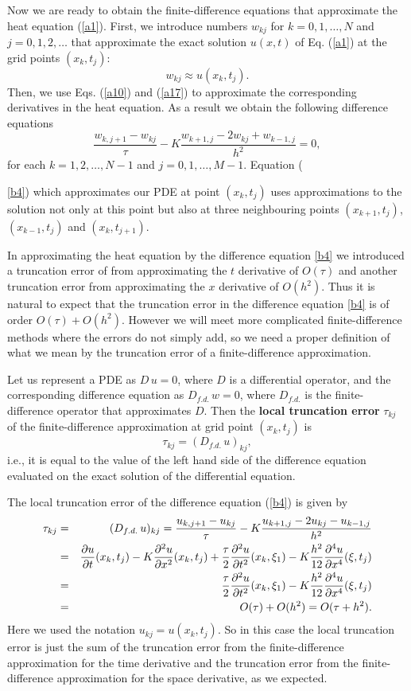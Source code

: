 Now we are ready to obtain the finite-difference equations that approximate
the heat equation (\ref{a1}). First, we introduce numbers $w_{kj}$ for $k=0,1,\dots,N$ and
$j=0,1,2,\dots$ that approximate the exact solution $u(x,t)$ of Eq. (\ref{a1}) at the grid points
$(x_{k}, t_{j})$:
\[
w_{kj}\approx u(x_{k},t_{j}).
\]
Then, we use Eqs. (\ref{a10}) and (\ref{a17}) to approximate
the corresponding derivatives in the heat equation. As a result we obtain the following
difference equations
\begin{equation}
\frac{w_{k,j+1}-w_{kj}}{\tau}-K
\frac{w_{k+1, j}-2w_{kj}+w_{k-1,j}}{h^{2}}=0, \label{b4}
\end{equation}
for each $k=1, 2, \dots, N-1$ and $j=0, 1, \dots, M-1$. Equation ({\ref{b4})
which approximates our PDE at point $(x_{k},t_{j})$ uses approximations to the solution
not only at this point but also
at three neighbouring points $(x_{k+1},t_{j})$, $(x_{k-1},t_{j})$ and $(x_{k},t_{j+1})$.

In approximating the heat equation by the difference equation \eqref{b4} we
introduced a truncation error of from approximating the $t$ derivative of $O(\tau)$
and another truncation error from approximating the $x$ derivative of $O(h^2)$.
Thus it is natural to expect that the truncation error in the difference
equation \eqref{b4} is of order $O(\tau)+O(h^2)$. However we will meet more 
complicated finite-difference methods where the errors do not simply add, so
we need a proper definition of what we mean by the truncation error of a 
finite-difference approximation.

\begin{definition}
Let us represent a PDE as $D\,u=0$, where $D$ is a differential operator,
and the corresponding difference equation as $D_{f.d.}\,w=0$, where
$D_{f.d.}$ is the finite-difference operator that approximates $D$. Then
the {\bf local truncation error} $\tau_{kj}$ of the finite-difference 
approximation at grid point $(x_k,t_j)$ is 
\[\tau_{kj}=(D_{f.d.}\,u)_{kj},\]
i.e., it is equal to the value of the left hand side of the difference
equation evaluated on the exact solution of the differential equation.
\end{definition}
The local truncation error of
the difference equation (\ref{b4}) is given by
\begin{eqnarray*}
\tau_{kj} &=& (D_{f.d.}\,u)_{kj} =
\frac{u_{k,j+1}-u_{kj}}{\tau}-K
\frac{u_{k+1, j}-2u_{kj}-u_{k-1,j}}{h^{2}} \\
&=& \frac{{\partial} u}{{\partial} t}(x_{k},t_{j})-
K\frac{{\partial}^2 u}{{\partial} x^2}(x_{k},t_{j})+
\frac{\tau}{2}\frac{{\partial}^{2} u}{{\partial} t^{2}}(x_{k},
\xi_{1})- K\frac{h^{2}}{12}\frac{{\partial}^{4} u}{{\partial} x^{4}}(\xi,t_{j})\\
&=&\frac{\tau}{2}\frac{{\partial}^{2} u}{{\partial} t^{2}}(x_{k},
\xi_{1})- K\frac{h^{2}}{12}\frac{{\partial}^{4} u}{{\partial} x^{4}}(\xi,t_{j})\\
&=&O(\tau)+O(h^{2})=O(\tau+h^{2}). 
\end{eqnarray*}
Here we used the notation $u_{kj}=u(x_{k}, t_{j})$. 
So in this case the local truncation error is just the sum of the truncation error
from the finite-difference approximation for the time derivative and
the truncation error from the finite-difference approximation for the space
derivative, as we expected.

}
